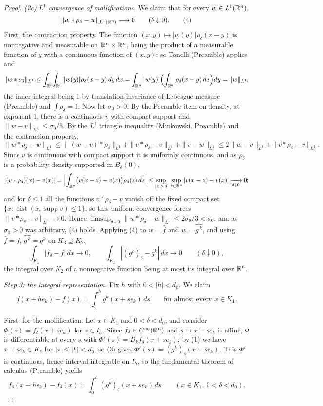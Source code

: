 \begin{proof}
\emph{(2c) $L^1$ convergence of mollifications.}  We claim that for every
$w\in L^1(\mathbb{R}^n)$,
\[
\|w*\rho_\delta-w\|_{L^1(\mathbb{R}^n)}\longrightarrow0\qquad(\delta\downarrow0).
\tag{4}
\]
First, the contraction property.  The function
$(x,y)\mapsto|w(y)|\rho_\delta(x-y)$ is nonnegative and measurable on
$\mathbb{R}^n\times\mathbb{R}^n$, being the product of a measurable function of $y$ with a
continuous function of $(x,y)$; so Tonelli (Preamble) applies and
\[
\|w*\rho_\delta\|_{L^1}
\le\int_{\mathbb{R}^n}\!\!\int_{\mathbb{R}^n}|w(y)|\rho_\delta(x-y)\,dy\,dx
=\int_{\mathbb{R}^n}|w(y)|\Bigl(\int_{\mathbb{R}^n}\rho_\delta(x-y)\,dx\Bigr)dy=\|w\|_{L^1},
\]
the inner integral being $1$ by translation invariance of Lebesgue measure
(Preamble) and $\int\rho_\delta=1$.  Now let $\sigma_0>0$.  By the Preamble
item on density, at exponent $1$, there is a continuous $v$ with compact support
and $\|w-v\|_{L^1}\le\sigma_0/3$.  By the $L^1$ triangle inequality
(Minkowski, Preamble) and the contraction property,
\[
\|w*\rho_\delta-w\|_{L^1}
\le\|(w-v)*\rho_\delta\|_{L^1}+\|v*\rho_\delta-v\|_{L^1}+\|v-w\|_{L^1}
\le2\|w-v\|_{L^1}+\|v*\rho_\delta-v\|_{L^1}.
\]
Since $v$ is continuous with compact support it is uniformly continuous, and as
$\rho_\delta$ is a probability density supported in $\overline{B_\delta(0)}$,
\[
|(v*\rho_\delta)(x)-v(x)|
=\Bigl|\int_{\R^n}\bigl(v(x-z)-v(x)\bigr)\rho_\delta(z)\,dz\Bigr|
\le\sup_{|z|\le\delta}\ \sup_{x\in\R^n}|v(x-z)-v(x)|\xrightarrow[\delta\downarrow0]{}0 ;
\]
and for $\delta\le1$ all the functions $v*\rho_\delta-v$ vanish off the fixed
compact set $\{x:\operatorname{dist}(x,\operatorname{supp}v)\le1\}$, so this
uniform convergence forces $\|v*\rho_\delta-v\|_{L^1}\to0$.  Hence
$\limsup_{\delta\downarrow0}\|w*\rho_\delta-w\|_{L^1}\le2\sigma_0/3<\sigma_0$,
and as $\sigma_0>0$ was arbitrary, (4) holds.  Applying (4) to
$w=\widehat f$ and $w=\widehat{g^{\,k}}$, and using
$\widehat f=f$, $\widehat{g^{\,k}}=g^k$ on $K_3\supseteq K_2$,
\[
\int_{K_2}|f_\delta-f|\,dx\longrightarrow0,
\qquad
\int_{K_2}|(g^k)_\delta-g^k|\,dx\longrightarrow0
\qquad(\delta\downarrow0),
\tag{5}
\]
the integral over $K_2$ of a nonnegative function being at most its integral
over $\mathbb{R}^n$.

\emph{Step 3: the integral representation.}  Fix $h$ with $0<|h|<d_0$.  We claim
\[
f(x+he_k)-f(x)=\int_0^hg^k(x+se_k)\,ds
\qquad\text{for almost every }x\in K_1 .
\tag{6}
\]

First, for the mollification.  Let $x\in K_1$ and $0<\delta<d_0$, and consider
$\Phi(s)=f_\delta(x+se_k)$ for $s\in I_h$.  Since $f_\delta\in C^\infty(\mathbb{R}^n)$
and $s\mapsto x+se_k$ is affine, $\Phi$ is differentiable at every $s$ with
$\Phi'(s)=D_kf_\delta(x+se_k)$; by (1) we have $x+se_k\in K_2$ for $|s|\le|h|<d_0$,
so (3) gives $\Phi'(s)=(g^k)_\delta(x+se_k)$.  This $\Phi'$ is continuous, hence
interval-integrable on $I_h$, so the fundamental theorem of calculus (Preamble)
yields
\[
f_\delta(x+he_k)-f_\delta(x)=\int_0^h(g^k)_\delta(x+se_k)\,ds
\qquad(x\in K_1,\ 0<\delta<d_0).
\tag{7}
\]


\end{proof}
